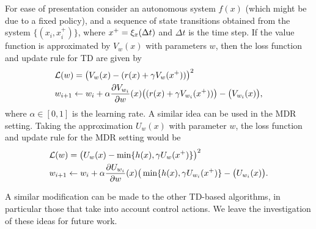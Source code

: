 For ease of presentation consider an autonomous system $f(x)$ (which might be due to a fixed policy), and a sequence of state transitions obtained from the system $\{(x_i,x_i^+)\}$, where $x^+=\xi_x(\Delta t)$ and $\Delta t$ is the time step. If the value function is approximated by $V_w(x)$ with parameters $w$, then the loss function and update rule for TD are given by
%
\begin{equation}
\begin{split}
&\mathcal{L}(w)=\big(V_{w}(x) - (r(x)+\gamma V_{w}(x^+))\big)^2\\
&w_{i+1} \leftarrow w_i + \alpha\frac{\partial V_{w_i}}{\partial w}(x)\big((r(x)+\gamma V_{w_i}(x^+))\big)- \big(V_{w_i}(x)\big),
\end{split}
\end{equation}%
\noindent where $\alpha \in [0,1]$ is the learning rate. A similar idea can be used in the MDR setting. Taking the approximation $U_w(x)$ with parameter $w$, the loss function and update rule for the MDR setting would be
%
\begin{equation}
\begin{split}
&\mathcal{L}(w)=\big(U_{w}(x) - \min\{h(x),\gamma U_{w}(x^+)\}\big)^2\\
&w_{i+1} \leftarrow w_i + \alpha\frac{\partial U_{w_i}}{\partial w}(x)\big(\min\{h(x),\gamma U_{w_i}(x^+)\}- \big(U_{w_i}(x)\big).
\end{split}
\end{equation}

A similar modification can be made to the other TD-based algorithms, in particular those that take into account control actions. We leave the investigation of these ideas for future work. 




